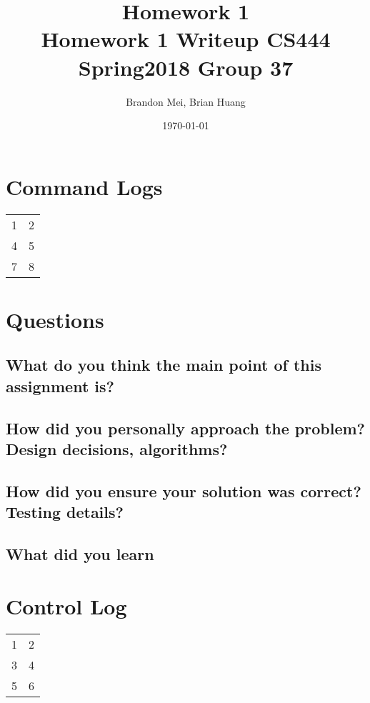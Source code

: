 \documentclass[onecolumn, 10pt, titlepage]{IEEEtran}
\title
{%
	Homework 1 \\
	\vspace{0.4cm}
	\large Homework 1 Writeup
	\vspace{0.4cm}
	\large CS444 Spring2018 Group 37
}
\author{Brandon Mei, Brian Huang}
\date{\today}
\begin{document}
\maketitle

\section*{Command Logs}
\begin{center}
	\begin{tabular}{ c c }
		1 & 2 \\
		4 & 5 \\
		7 & 8 
	\end{tabular}
\end{center}

\section*{Questions}
\subsection*{What do you think the main point of this assignment is?}
\subsection*{How did you personally approach the problem? Design decisions, algorithms?}
\subsection*{How did you ensure your solution was correct? Testing details?}
\subsection*{What did you learn}

\section*{Control Log}
\begin{center}
	\begin{tabular}{ c c }
		1 & 2 \\
		3 & 4 \\
		5 & 6
	\end{tabular}
\end{center}
\end{document}

